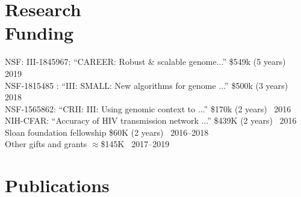\documentclass[margin,line,letterpaper]{resume}
\begin{document}
\begin{resume}
    
    
    \section{\mysidestyle Research\\Funding}
      NSF: III-1845967:  ``CAREER: Robust \& scalable genome...''
 \$549k (5 years)~
 \hfill 2019\\
      NSF-1815485 :  ``III: SMALL: New algorithms for genome ...''
 \$500k (3 years)~
 \hfill 2018\\
 NSF-1565862:  ``CRII: III: Using genomic context to ...''
 \$170k (2 years)~
 \hfill 2016\\
 NIH-CFAR:  ``Accuracy of HIV transmission network ...''
 \$439K (2 years)~
 \hfill 2016\\
 Sloan foundation fellowship \$60K (2 years) \hfill  ~2016--2018\\
 Other gifts and grants $\approx$\$145K  \hfill  ~2017--2019
\clearpage

    \renewcommand*{\thefootnote}{\fnsymbol{footnote}}
    \section{\mysidestyle Publications}

\newcommand\blfootnote[1]{%
  \begingroup
  \renewcommand\thefootnote{}\footnote{#1}%
  \addtocounter{footnote}{-1}%
  \endgroup
}
    
\def\FormatName#1{%
  \def\myname{Siavash Mirarab}
  \def\mynamee{Siavash Mirarab*}%
  \edef\name{#1}%
  \ifx\name\myname
    \textbf{#1}%
  \else
    \ifx\name\mynamee
       \textbf{Siavash Mirarab}\footnote[1]{Equal contributions}%
    \else
      #1%
    \fi
  \fi
}

\vspace{-2pt}
\begin{spacing}{1.2}

\end{spacing}


\vspace{-10pt}


\end{resume}
\end{document}
